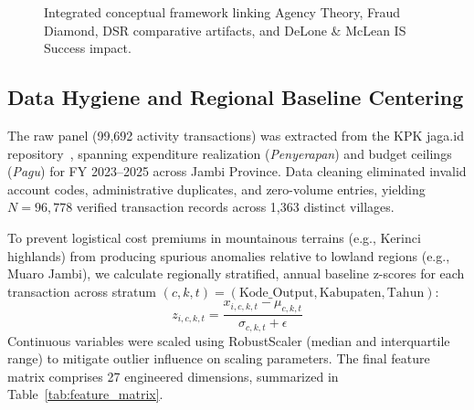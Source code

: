 \documentclass[conference]{IEEEtran}
\begin{document}
\begin{figure}[htbp]
\centering
{}
\caption{Integrated conceptual framework linking Agency Theory, Fraud Diamond, DSR comparative artifacts, and DeLone \& McLean IS Success impact.}
\label{fig:conceptual_framework}
\end{figure}

\subsection{Data Hygiene and Regional Baseline Centering}

The raw panel (99,692 activity transactions) was extracted from the KPK jaga.id repository~\cite{ref26}, spanning expenditure realization (\textit{Penyerapan}) and budget ceilings (\textit{Pagu}) for FY 2023--2025 across Jambi Province. Data cleaning eliminated invalid account codes, administrative duplicates, and zero-volume entries, yielding $N = 96,778$ verified transaction records across 1,363 distinct villages.

To prevent logistical cost premiums in mountainous terrains (e.g., Kerinci highlands) from producing spurious anomalies relative to lowland regions (e.g., Muaro Jambi), we calculate regionally stratified, annual baseline z-scores for each transaction across stratum $(c, k, t) = (\text{Kode\_Output}, \text{Kabupaten}, \text{Tahun})$:
\begin{equation}
z_{i,c,k,t} = \frac{x_{i,c,k,t} - \mu_{c,k,t}}{\sigma_{c,k,t} + \epsilon}
\end{equation}
Continuous variables were scaled using RobustScaler (median and interquartile range) to mitigate outlier influence on scaling parameters. The final feature matrix comprises 27 engineered dimensions, summarized in Table~\ref{tab:feature_matrix}.
\end{document}
